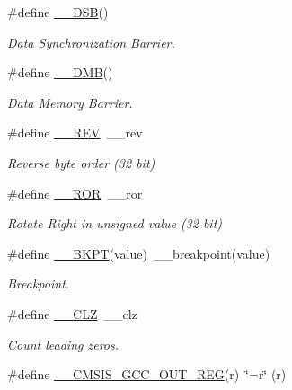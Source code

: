 \begin{DoxyCompactItemize}
\#define \hyperlink{group___c_m_s_i_s___core___instruction_interface_ga067d257a2b34565410acefb5afef2203}{\+\_\+\+\_\+\+D\+SB}()
\begin{DoxyCompactList}\small\item\em Data Synchronization Barrier. \end{DoxyCompactList}\item 
\#define \hyperlink{group___c_m_s_i_s___core___instruction_interface_ga671101179b5943990785f36f8c1e2269}{\+\_\+\+\_\+\+D\+MB}()
\begin{DoxyCompactList}\small\item\em Data Memory Barrier. \end{DoxyCompactList}\item 
\#define \hyperlink{group___c_m_s_i_s___core___instruction_interface_ga14f54807872c0f5e05604c4924abfdae}{\+\_\+\+\_\+\+R\+EV}~\+\_\+\+\_\+rev
\begin{DoxyCompactList}\small\item\em Reverse byte order (32 bit) \end{DoxyCompactList}\item 
\#define \hyperlink{group___c_m_s_i_s___core___instruction_interface_ga95b9bd281ddeda378b85afdb8f2ced86}{\+\_\+\+\_\+\+R\+OR}~\+\_\+\+\_\+ror
\begin{DoxyCompactList}\small\item\em Rotate Right in unsigned value (32 bit) \end{DoxyCompactList}\item 
\#define \hyperlink{group___c_m_s_i_s___core___instruction_interface_ga15ea6bd3c507d3e81c3b3a1258e46397}{\+\_\+\+\_\+\+B\+K\+PT}(value)~\+\_\+\+\_\+breakpoint(value)
\begin{DoxyCompactList}\small\item\em Breakpoint. \end{DoxyCompactList}\item 
\#define \hyperlink{group___c_m_s_i_s___core___instruction_interface_ga5d5bb1527e042be4a9fa5a33f65cc248}{\+\_\+\+\_\+\+C\+LZ}~\+\_\+\+\_\+clz
\begin{DoxyCompactList}\small\item\em Count leading zeros. \end{DoxyCompactList}\item 
\#define \hyperlink{group___c_m_s_i_s___core___instruction_interface_gabc17e391c13c71702366c67cba39c276}{\+\_\+\+\_\+\+C\+M\+S\+I\+S\+\_\+\+G\+C\+C\+\_\+\+O\+U\+T\+\_\+\+R\+EG}(r)~\char`\"{}=r\char`\"{} (r)
\item 

\end{DoxyCompactItemize}
